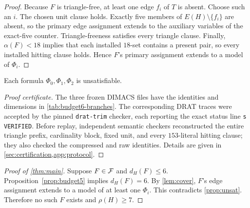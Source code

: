 \begin{proof}
Because \(F\) is triangle-free, at least one edge \(f_i\) of \(T\) is absent.
Choose such an \(i\).  The chosen unit clause holds.  Exactly five members of
\(E(H)\setminus\{f_i\}\) are absent, so the primary edge assignment extends
to the auxiliary variables of the exact-five counter.  Triangle-freeness
satisfies every triangle clause.  Finally, \(\alpha(F)<18\) implies that each
installed \(18\)-set contains a present pair, so every installed hitting
clause holds.  Hence \(F\)'s primary assignment extends to a model of
\(\Phi_i\).
\end{proof}

\begin{proposition}\label{prop:unsat}
Each formula \(\Phi_0,\Phi_1,\Phi_2\) is unsatisfiable.
\end{proposition}

\begin{proof}[Proof certificate]
The three frozen DIMACS files have the identities and dimensions in
\cref{tab:budget6-branches}.  The corresponding DRAT traces were accepted by
the pinned \texttt{drat-trim} checker, each reporting the exact status line
\texttt{s VERIFIED}.
Before replay, independent semantic checkers reconstructed the entire
triangle prefix, cardinality block, fixed unit, and every \(153\)-literal
hitting clause; they also checked the compressed and raw identities.  Details
are given in \cref{sec:certification,app:protocol}.
\end{proof}

\begin{proof}[Proof of \cref{thm:main}]
Suppose \(F\in\mathcal F\) and \(d_H(F)\le6\).  Proposition~\ref{prop:budget5}
implies \(d_H(F)=6\).  By \cref{lem:cover}, \(F\)'s edge assignment extends
to a model of at least one \(\Phi_i\).  This contradicts
\cref{prop:unsat}.  Therefore no such \(F\) exists and \(\rho(H)\ge7\).
\end{proof}
